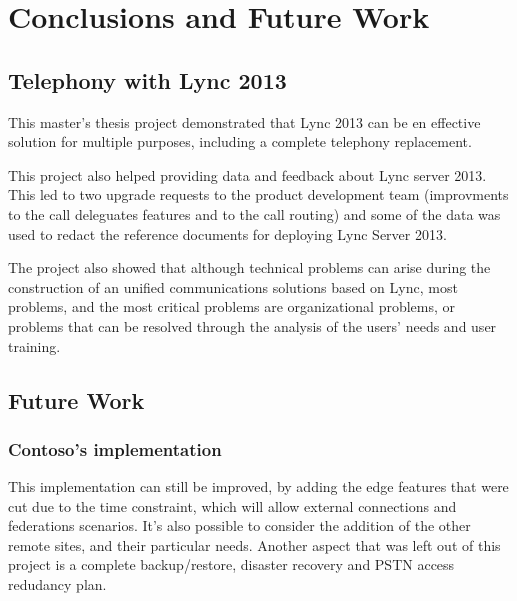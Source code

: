 	



\chapter{Conclusions and Future Work}

\section{Telephony with Lync 2013}

This master's thesis project demonstrated that Lync 2013 can be en effective solution for multiple purposes, including a complete telephony replacement. 

This project also helped providing data and feedback about Lync server 2013. This led to two upgrade requests to the product development team (improvments to the call deleguates features and to the call routing) and some of the data was used to redact the reference documents for deploying Lync Server 2013.

The project also showed that although technical problems can arise during the construction of an unified communications solutions based on Lync, most problems, and the most critical problems are organizational problems, or problems that can be resolved through the analysis of the users' needs and user training.


\section{Future Work}

\subsection{Contoso's implementation}
This implementation can still be improved, by adding the edge features that were cut due to the time constraint, which will allow external connections and federations scenarios. It's also possible to consider the addition of the other remote sites, and their particular needs. Another aspect that was left out of this project is a complete backup/restore, disaster recovery and PSTN access redudancy plan.

